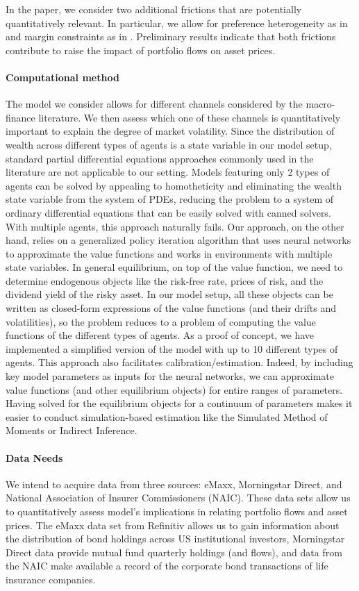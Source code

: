 In the paper, we consider two additional frictions that are potentially quantitatively relevant. 
In particular, we allow for preference heterogeneity as in \citet{garleanu2015young} and
margin constraints as in \citet{adrian2014financial}.
Preliminary results indicate that both frictions contribute to raise the impact of portfolio flows on asset prices.


\paragraph{Computational method} 
The model we consider allows for different channels considered by the macro-finance literature. 
We then assess which one of these channels is quantitatively important to explain the degree of market volatility. Since the distribution of wealth across different types of agents is a state variable in our model setup, standard partial differential equations approaches commonly used in the literature are not applicable to our setting. Models featuring only 2 types of agents can be solved by appealing to homotheticity and eliminating the wealth state variable from the system of PDEs, reducing the problem to a system of ordinary differential equations that can be easily solved with canned solvers. With multiple agents, this approach naturally fails. Our approach, on the other hand, relies on a generalized policy iteration algorithm that uses neural networks to approximate the value functions and works in environments with multiple state variables.
In general equilibrium, on top of the value function, we need to determine endogenous objects like the risk-free rate, prices of risk, and the dividend yield of the risky asset. In our model setup, all these objects can be written as closed-form expressions of the value functions (and their drifts and volatilities), so the problem reduces to a problem of computing the value functions of the different types of agents. As a proof of concept, we have implemented a simplified version of the model with up to 10 different types of agents. This approach also facilitates calibration/estimation. Indeed, by including key model parameters as inputs for the neural networks, we can approximate value functions (and other equilibrium objects) for entire ranges of parameters. Having solved for the equilibrium objects for a continuum of parameters makes it easier to conduct simulation-based estimation like the Simulated Method of Moments or Indirect Inference.


\paragraph{Data Needs} 
We intend to acquire data from three sources: eMaxx, Morningstar Direct, and National
Association of Insurer Commissioners (NAIC). These data sets allow us to quantitatively assess model's implications in relating portfolio flows and asset prices. The eMaxx data set from Refinitiv allows us to gain information about the distribution of bond holdings across US institutional investors, Morningstar Direct data provide mutual fund quarterly holdings (and flows), and data from the NAIC make available a record of the corporate bond transactions of life insurance companies.

